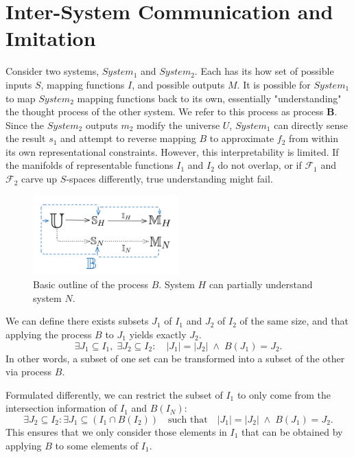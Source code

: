 \documentclass[]{article}
\begin{document}
\section{Inter-System Communication and Imitation}
Consider two systems, $System_1$ and $System_2$. Each has its how set of possible inputs $S$, mapping functions $I$, and possible outputs $M$. It is possible for $System_1$ to map $System_2$ mapping functions back to its own, essentially "understanding" the thought process of the other system. We refer to this process as process $\mathbf{B}$.\\
Since the $System_2$ outputs $m_2$ modify the universe $U$, $System_1$ can directly sense the result $s_1$ and attempt to reverse mapping $B$ to approximate $f_2$ from within its own representational constraints. However, this interpretability is limited. If the manifolds of representable functions $I_1$ and $I_2$ do not overlap, or if $\mathcal{F}_1$ and $\mathcal{F}_2$ carve up $S$-spaces differently, true understanding might fail.

\begin{figure}[h]
	\centering
	\includegraphics[width=0.5\textwidth]{b}
	\caption{Basic outline of the process $B$. System $H$ can partially understand system $N$.}
	\label{fig:fig2}
\end{figure}

We can define there exists subsets $J_1$ of $I_1$ and $J_2$ of $I_2$ of the same size, and that applying the process $B$ to $J_1$ yields exactly $J_2$.
\[
\exists J_1 \subseteq I_1,\; \exists J_2 \subseteq I_2 : \quad |J_1| = |J_2| \;\wedge\; B(J_1) = J_2.
\]
In other words, a subset of one set can be transformed into a subset of the other via process $B$.

Formulated differently, we can restrict the subset of $I_1$ to only come from the intersection information of $I_1$ and $B(I_N)$:
\[
\exists J_2 \subseteq I_2 : \exists J_1 \subseteq (I_1 \cap B(I_2)) \quad \text{such that} \quad |J_1| = |J_2| \;\wedge\; B(J_1) = J_2.
\]
This ensures that we only consider those elements in $I_1$ that can be obtained by applying $B$ to some elements of $I_1$.
\end{document}
